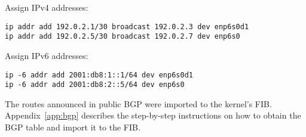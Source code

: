 Assign IPv4 addresses:
\begin{lstlisting}
ip addr add 192.0.2.1/30 broadcast 192.0.2.3 dev enp6s0d1
ip addr add 192.0.2.5/30 broadcast 192.0.2.7 dev enp6s0
\end{lstlisting}
Assign IPv6 addresses:
\begin{lstlisting}
ip -6 addr add 2001:db8:1::1/64 dev enp6s0d1
ip -6 addr add 2001:db8:2::5/64 dev enp6s0
\end{lstlisting}

The routes announced in public BGP were imported to the kernel's FIB.
Appendix~\ref{app:bgp} describes the step-by-step instructions on how to obtain the BGP table and import it to the FIB.
